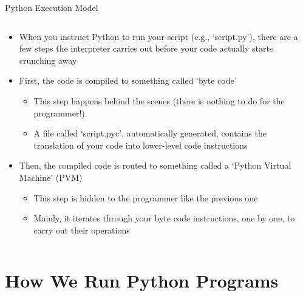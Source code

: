\documentclass[aspectratio=1610]{beamer}
\begin{document}
\begin{frame}[c]{Python Execution Model}
	\begin{columns}
		\begin{column}{0.65\textwidth}
			\begin{itemize}
				\item When you instruct Python to run your script (e.g., `script.py'), there are a few steps the interpreter carries out before your code actually starts crunching away
				\item First, the code is compiled to something called `byte code'
				\begin{itemize}
					\item This step happens behind the scenes (there is nothing to do for the programmer!)
      					\item A file called `script.pyc', automatically generated, contains the translation of your code into lower-level code instructions
				\end{itemize}
				\item Then, the compiled code is routed to something called a `Python Virtual Machine' (PVM)
				\begin{itemize}
					\item This step is hidden to the programmer like the previous one
					\item Mainly, it iterates through your byte code instructions, one by one, to carry out their operations
			\end{itemize}
				\end{itemize}
		\end{column}
		\begin{column}{0.35\textwidth}
			\centering
		\end{column}
	\end{columns}
\end{frame}

\section{How We Run Python Programs}
\end{document}
